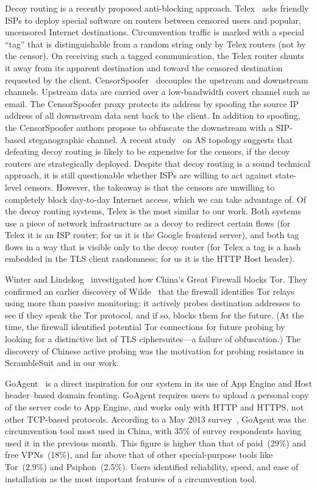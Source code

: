 \documentclass{article}
\begin{document}
Decoy routing is
a recently proposed anti-blocking approach. Telex~\cite{telex}
asks friendly ISPs to deploy special software on routers between censored users and
popular, uncensored Internet destinations.
Circumvention traffic is marked with a special ``tag'' that is distinguishable from a random string only
by Telex routers (not by the censor).
On receiving such a tagged communication, the Telex router shunts it away from its apparent destination
and toward the censored destination requested by the client.
CensorSpoofer~\cite{censorspoofer}
decouples the upstream and downstream channels.
Upstream data are carried over a low-bandwidth covert channel such as email.
The CensorSpoofer proxy protects its address by
spoofing the source IP address of all downstream data sent back to the client.
In addition to spoofing, the CensorSpoofer authors propose to obfuscate the downstream with a SIP-based steganographic channel.
A recent study~\cite{nodirectionhome} on AS
topology suggests that defeating decoy routing is likely to be expensive for the
censors, if the decoy routers are strategically deployed. Despite that decoy
routing is a sound technical approach, it is still questionable whether ISPs are
willing to act against state-level censors. However, the takeaway is that the
censors are unwilling to completely block day-to-day Internet access, which we
can take advantage of.
Of the decoy routing systems, Telex is the most similar to our work.
Both systems use a piece of network infrastructure as a decoy to redirect certain flows
(for Telex it is an ISP router; for us it is the Google frontend server),
and both tag flows in a way that is visible only to the decoy router
(for Telex a tag is a hash embedded in the TLS client randomness; for us it is the HTTP Host header).


Winter and Lindskog~\cite{foci12-winter} investigated how China's Great Firewall blocks Tor.
They confirmed an earlier discovery of Wilde~\cite{wilde} that the firewall identifies Tor relays using more than passive monitoring:
it actively probes destination addresses to see if they speak the Tor protocol, and if so,
blocks them for the future.
(At the time, the firewall identified potential Tor connections for future probing by looking for a distinctive
list of TLS ciphersuites---a failure of obfuscation.) %
The discovery of Chinese active probing was the motivation for probing resistance in ScrambleSuit
and in our work.

GoAgent~\cite{goagent} is a direct inspiration for our system in its use of App
Engine and Host header--based domain fronting. GoAgent requires users to upload
a personal copy of the server code to App Engine, and works only with HTTP and HTTPS,
not other TCP-based protocols.
According to a May 2013 survey~\cite{collateral-freedom},
GoAgent was the circumvention tool most used in
China, with 35\% of survey respondents having used it in the previous month.
This figure is higher than that of paid~(29\%) and free VPNs~(18\%), and far
above that of other special-purpose tools like Tor~(2.9\%) and Psiphon~(2.5\%).
Users identified reliability, speed, and ease of installation as the most important features of a circumvention tool.
\end{document}
